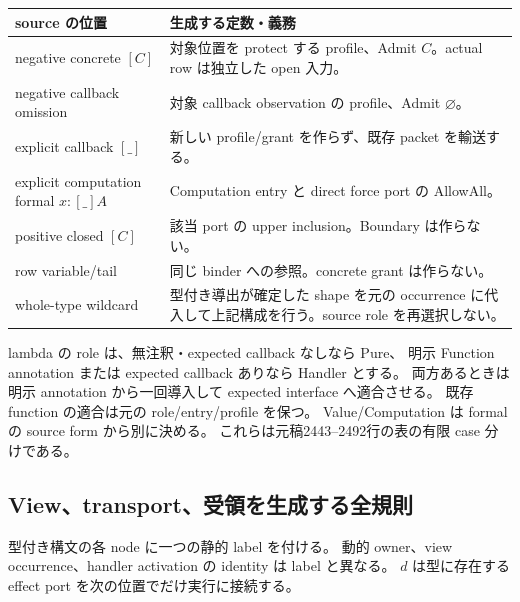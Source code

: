 \documentclass[11pt,a4paper]{article}
\begin{document}
\begin{longtable}{p{}p{}}
\toprule source の位置 & 生成する定数・義務 \\
\midrule\endhead
negative concrete \([C]\) & 対象位置を protect する profile、Admit \(C\)。actual row は独立した open 入力。\\
negative callback omission & 対象 callback observation の profile、Admit \(\varnothing\)。\\
explicit callback \([\_]\) & 新しい profile/grant を作らず、既存 packet を輸送する。\\
explicit computation formal \(x:[\_]A\) & Computation entry と direct force port の AllowAll。\\
positive closed \([C]\) & 該当 port の upper inclusion。Boundary は作らない。\\
row variable/tail & 同じ binder への参照。concrete grant は作らない。\\
whole-type wildcard & 型付き導出が確定した shape を元の occurrence に代入して上記構成を行う。source role を再選択しない。\\
\bottomrule
\end{longtable}

lambda の role は、無注釈・expected callback なしなら Pure、
明示 Function annotation または expected callback ありなら Handler とする。
両方あるときは明示 annotation から一回導入して expected interface へ適合させる。
既存 function の適合は元の role/entry/profile を保つ。
Value/Computation は formal の source form から別に決める。
これらは元稿2443--2492行の表の有限 case 分けである。

\subsection{View、transport、受領を生成する全規則}

型付き構文の各 node に一つの静的 label を付ける。
動的 owner、view occurrence、handler activation の identity は label と異なる。
\(d\) は型に存在する effect port を次の位置でだけ実行に接続する。
\end{document}
